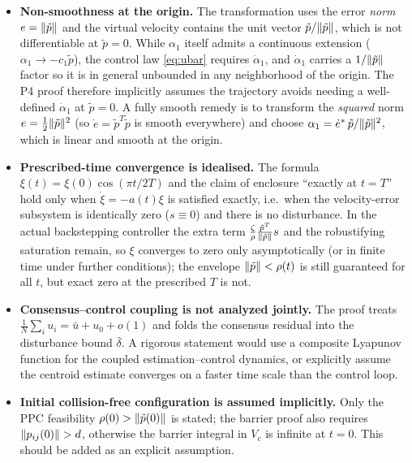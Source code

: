 \begin{itemize}
    \item \textbf{Non-smoothness at the origin.}
    The transformation uses the error \emph{norm} $e=\lVert \tilde p \rVert$ and the
    virtual velocity contains the unit vector $\tilde p/\lVert \tilde p \rVert$,
    which is not differentiable at $\tilde p=0$. While $\alpha_1$ itself
    admits a continuous extension ($\alpha_1\to -c_1\tilde p$), the control
    law \eqref{eq:ubar} requires $\dot\alpha_1$, and $\dot\alpha_1$ carries
    a $1/\lVert \tilde p \rVert$ factor so it is in general unbounded in any
    neighborhood of the origin. The P4 proof therefore implicitly assumes the
    trajectory avoids needing a well-defined $\dot\alpha_1$ at $\tilde p=0$.
    A fully smooth remedy is to transform the \emph{squared} norm
    $e=\tfrac12\lVert \tilde p \rVert^2$ (so $\dot e=\tilde p^T\dot{\tilde p}$ is
    smooth everywhere) and choose $\alpha_1=\dot e^*\,\tilde p/\lVert \tilde p \rVert^2$,
    which is linear and smooth at the origin.

    \item \textbf{Prescribed-time convergence is idealised.}
    The formula $\xi(t)=\xi(0)\cos(\pi t/2T)$ and the claim of enclosure
    ``exactly at $t=T$'' hold only when $\dot\xi=-a(t)\xi$ is satisfied
    exactly, i.e.\ when the velocity-error subsystem is identically zero
    ($s\equiv0$) and there is no disturbance. In the actual backstepping
    controller the extra term $\frac{\zeta}{\rho}\frac{\tilde p^T}{\lVert \tilde p \rVert}s$
    and the robustifying saturation remain, so $\xi$ converges to zero only
    asymptotically (or in finite time under further conditions); the envelope
    $\lVert \tilde p \rVert<\rho(t)$ is still guaranteed for all $t$, but exact zero
    at the prescribed $T$ is not.

    \item \textbf{Consensus--control coupling is not analyzed jointly.}
    The proof treats $\frac1N\sum_i u_i=\bar u+u_0+o(1)$ and folds the
    consensus residual into the disturbance bound $\bar\delta$. A rigorous
    statement would use a composite Lyapunov function for the coupled
    estimation--control dynamics, or explicitly assume the centroid estimate
    converges on a faster time scale than the control loop.

    \item \textbf{Initial collision-free configuration is assumed implicitly.}
    Only the PPC feasibility $\rho(0)>\lVert \tilde p(0) \rVert$ is stated; the
    barrier proof also requires $\lVert p_{ij}(0) \rVert>d$, otherwise the barrier
    integral in $V_c$ is infinite at $t=0$. This should be added as an
    explicit assumption.


\end{itemize}
